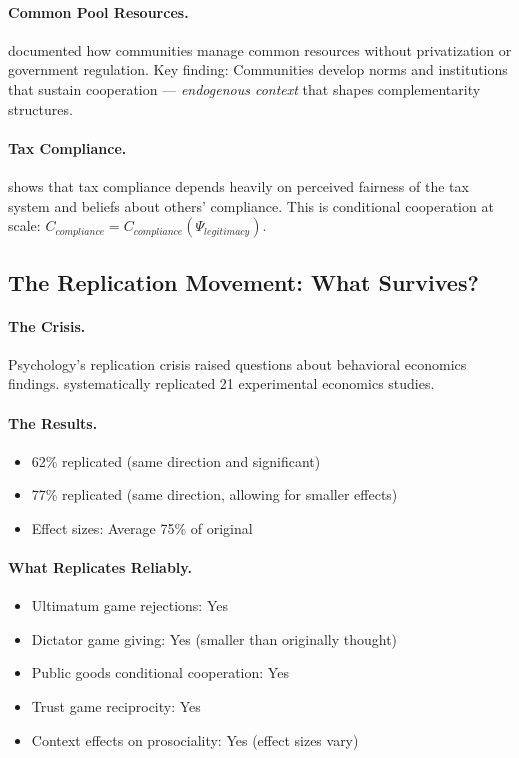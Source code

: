 \documentclass[12pt,a4paper]{article}
\begin{document}
\paragraph{Common Pool Resources.}
\citet{ostrom1990} documented how communities manage common resources
without privatization or government regulation.
Key finding: Communities develop norms and institutions that sustain cooperation \citep{axelrod1984evolution}---
\emph{endogenous context} that shapes complementarity structures.

\paragraph{Tax Compliance.}
\citet{slemrod} shows that tax compliance depends heavily on
perceived fairness of the tax system and beliefs about others' compliance.
This is conditional cooperation at scale: $C_{compliance} = C_{compliance}(\Psi_{legitimacy})$.

\subsection{The Replication Movement: What Survives?}

\paragraph{The Crisis.}
Psychology's replication crisis \citep{camloewetAl2016} raised questions about behavioral economics findings.
\citet{camerer2018evaluating} systematically replicated 21 experimental economics studies.

\paragraph{The Results.}
\begin{itemize}
  \item 62\% replicated (same direction and significant)
  \item 77\% replicated (same direction, allowing for smaller effects)
  \item Effect sizes: Average 75\% of original
\end{itemize}

\paragraph{What Replicates Reliably.}
\begin{itemize}
  \item Ultimatum game rejections: Yes
  \item Dictator game giving: Yes (smaller than originally thought)
  \item Public goods conditional cooperation: Yes
  \item Trust game reciprocity: Yes
  \item Context effects on prosociality: Yes (effect sizes vary)
\end{itemize}
\end{document}
